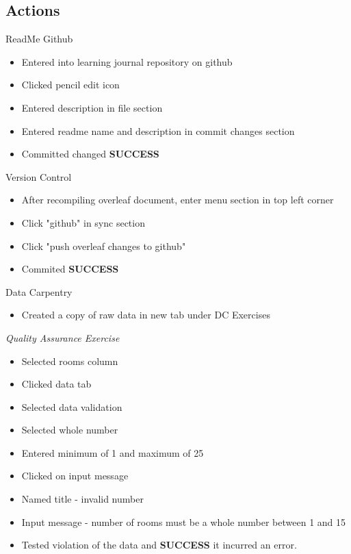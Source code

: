 \documentclass{article}
\begin{document}
\subsection{Actions}
ReadMe Github
\begin{itemize}
\item Entered into learning journal repository on github
\item Clicked pencil edit icon 
\item Entered description in file section 
\item Entered readme name and description in commit changes section
\item Committed changed \textbf{SUCCESS}
\end{itemize}

Version Control
\begin{itemize}
\item After recompiling overleaf document, enter menu section in top left corner
\item Click "github" in sync section
\item Click "push overleaf changes to github"
\item Commited \textbf{SUCCESS}

\end{itemize}
Data Carpentry 
\begin{itemize}
\item Created a copy of raw data in new tab under DC Exercises
\end{itemize}

\textit{Quality Assurance Exercise}
\begin{itemize}
\item Selected rooms column
\item Clicked data tab
\item Selected data validation
\item Selected whole number
\item Entered minimum of 1 and maximum of 25
\item Clicked on input message 
\item Named title - invalid number
\item Input message - number of rooms must be a whole number between 1 and 15
\item Tested violation of the data and \textbf{SUCCESS} it incurred an error.
\end{itemize}
\end{document}

